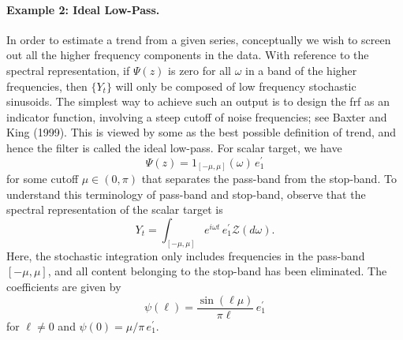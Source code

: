\documentclass[a4paper]{book}
\begin{document}
\paragraph{Example 2: Ideal Low-Pass.} 
 In order to estimate a trend from a given series, conceptually we wish
 to screen out all the higher frequency components in the data.  With reference
 to the spectral representation, if $\Psi (z)$ is zero for all $\omega$ in a 
 band of the higher frequencies, then $\{ Y_t \}$ will only be composed of 
 low frequency stochastic sinusoids.  The simplest way to achieve such an output
 is to design the frf as an indicator function, involving 
  a steep cutoff of noise frequencies; see Baxter and King (1999).  This is
 viewed by some as the best possible definition of trend, and hence the filter is
 called the ideal low-pass.  For scalar target, we have
\[
  \Psi (z) = 1_{ [ -\mu, \mu ]} (\omega) \, e_1^{\prime}
\]
 for some cutoff $\mu \in (0, \pi)$ that separates the pass-band from
the stop-band.  To understand this terminology of pass-band and stop-band, observe
 that the spectral representation of the scalar target is
\[
  Y_t = \int_{ [-\mu, \mu]} e^{i \omega t} \, e_1^{\prime} 
  \mathcal{Z} (d\omega).
\]
  Here, the stochastic integration only includes frequencies in the pass-band 
 $[-\mu, \mu]$,  and all content belonging to the stop-band has been eliminated.
 The coefficients are given by 
\[ 
  \psi (\ell) = \frac{ \sin (\ell \mu) }{ \pi \ell } \, e_1^{\prime}
\]
 for $\ell \neq 0$ and $\psi (0) = \mu/\pi \, e_1^{\prime}$.   
\end{document}
